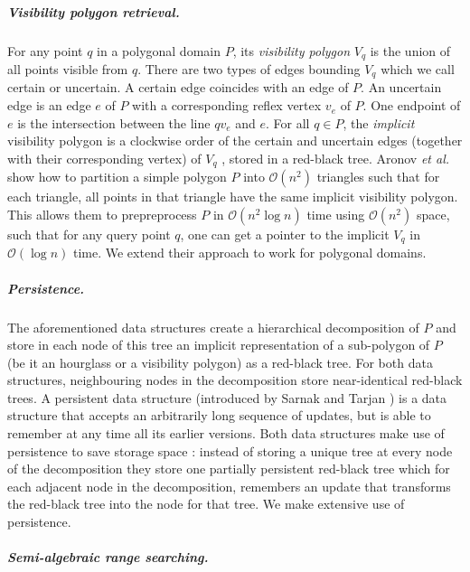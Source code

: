 \documentclass[a4paper, UKenglish]{paper}
\newcommand{\etal}{\textit{et al.}\xspace}
\begin{document}
\subparagraph{Visibility polygon retrieval.}
For any point $q$ in a polygonal domain $P$, its \emph{visibility polygon} $V_q$ is the union of all points visible from $q$. There are two types of edges bounding $V_q$ which we call certain or uncertain. A certain edge coincides with an edge of $P$. An uncertain edge is an edge $e$ of $P$ with a corresponding reflex vertex $v_e$ of $P$. One endpoint of $e$ is the intersection between the line $qv_e$ and $e$. For all $q \in P$, the \emph{implicit} visibility polygon is a clockwise order of the certain and uncertain edges (together with their corresponding vertex) of $V_q$ , stored in a red-black tree. Aronov \etal \cite{aronov2002visibility} show how to partition a simple polygon $P$ into $\mathcal{O}(n^2)$ triangles such that for each triangle, all points in that triangle have the same implicit visibility polygon. This allows them to prepreprocess $P$ in $\mathcal{O}(n^2\log n)$ time using $\mathcal{O}(n^2)$ space, such that for any query point $q$, one can get a pointer to the implicit $V_q$ in $\mathcal{O}(\log n)$ time. We extend their approach to work for polygonal domains.





\subparagraph{Persistence.}
The aforementioned data structures create a hierarchical decomposition of $P$ and store in each node of this tree an implicit representation of a sub-polygon of $P$ (be it an hourglass or a visibility polygon) as a red-black tree. For both data structures, neighbouring nodes in the decomposition store near-identical red-black trees. A persistent data structure (introduced by Sarnak and Tarjan \cite{sarnak1986planar}) is a data structure that accepts an arbitrarily long sequence of updates, but is able to remember at any time all its earlier versions. Both data structures make use of persistence to save storage space \cite{hershberger1991new, aronov2002visibility}: instead of storing a unique tree at every node of the decomposition they store one partially persistent red-black tree  which for each adjacent node in the decomposition, remembers an update that transforms the red-black tree into the node for that tree. We make extensive use of persistence.

\subparagraph{Semi-algebraic range searching.}
\end{document}
